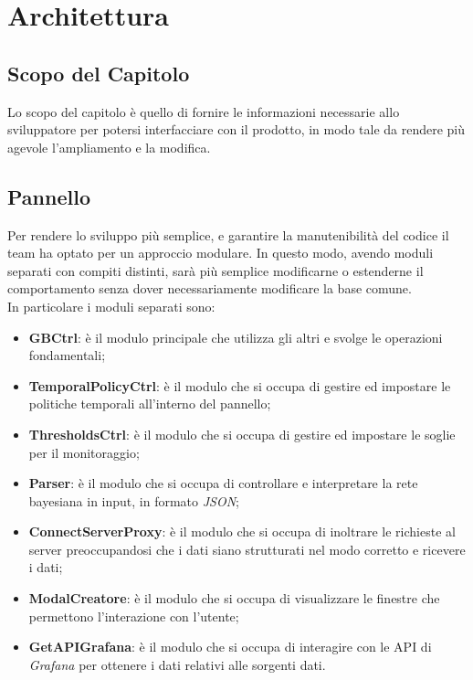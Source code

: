 \section{Architettura}\label{architettura}
\subsection{Scopo del Capitolo}
Lo scopo del capitolo è quello di fornire le informazioni necessarie allo sviluppatore per potersi interfacciare con il prodotto, in modo tale da rendere più agevole l'ampliamento e la modifica.

\subsection{Pannello}\label{archPannello}
Per rendere lo sviluppo più semplice, e garantire la manutenibilità del codice il team ha optato per un approccio modulare. In questo modo, avendo moduli separati con compiti distinti, sarà più semplice modificarne o estenderne il comportamento senza dover necessariamente modificare la base comune.\\
In particolare i moduli separati sono:
\begin{itemize}
	\item \textbf{GBCtrl}: è il modulo principale che utilizza gli altri e svolge le operazioni fondamentali;
	\item \textbf{TemporalPolicyCtrl}: è il modulo che si occupa di gestire ed impostare le politiche temporali all'interno del pannello;
	\item \textbf{ThresholdsCtrl}: è il modulo che si occupa di gestire ed impostare le soglie per il monitoraggio;
	\item \textbf{Parser}: è il modulo che si occupa di controllare e interpretare la rete bayesiana in input, in formato \textit{JSON};
	\item \textbf{ConnectServerProxy}: è il modulo che si occupa di inoltrare le richieste al server preoccupandosi che i dati siano strutturati nel modo corretto e ricevere i dati;
	\item \textbf{ModalCreatore}: è il modulo che si occupa di visualizzare le finestre che permettono l'interazione con l'utente;
	\item \textbf{GetAPIGrafana}: è il modulo che si occupa di interagire con le API di \textit{Grafana} per ottenere i dati relativi alle sorgenti dati.
\end{itemize}


